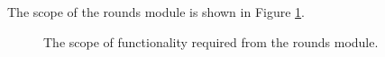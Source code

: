 The scope of the rounds module is shown in Figure \ref{fig:rounds_scope}. 

\begin{figure}[htb]
\begin{center}
\end{center}
\caption{The scope of functionality required from the rounds module. \label{fig:rounds_scope}}
\end{figure}



